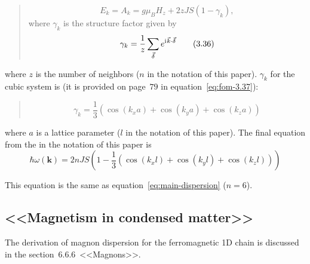     \begin{quote}
        \begin{equation}
            E_k = A_k = g\mu_B H_z + 2zJS(1 - \gamma_k), \label{eq:fom-3.35} \tag{3.35}
        \end{equation}
        where $\gamma_k$ is the structure factor given by
        \begin{equation}
            \gamma_k = \dfrac{1}{z}\sum_{\vec{\delta}}e^{\mathrm{i}\mkern1mu \vec{k}\cdot\vec{\delta}} \label{eq:fom-3.36} \tag{3.36}
        \end{equation}
    \end{quote}
    where $z$ is the number of neighbors ($n$ in the notation of this paper). $\gamma_k$ for the cubic system is (it is provided on page~$79$ in equation~\eqref{eq:fom-3.37}):
    \begin{quote}
        \begin{equation}
            \gamma_k = \dfrac{1}{3}(\cos(k_xa) + \cos(k_ya) + \cos(k_za)) \label{eq:fom-3.37} \tag{3.37}
        \end{equation}
    \end{quote}
    where $a$ is a lattice parameter ($l$ in the notation of this paper). The final equation from the \cite{rezende2020fundamentals} in the notation of this paper is
    \begin{equation}
        \hbar\omega(\mathbf{k}) = 2nJS\left(1 - \dfrac{1}{3}\left(\cos(k_xl) + \cos(k_yl) + \cos(k_zl)\right)\right)
        \label{eq:rezende}
    \end{equation}

    This equation is the same as equation~\eqref{eq:main-dispersion} ($n = 6$).

\subsection{<<Magnetism in condensed matter>>\cite{blundell2003magnetism}}
    The derivation of magnon dispersion for the ferromagnetic 1D chain is discussed in the section~$6.6.6$~<<Magnons>>.

